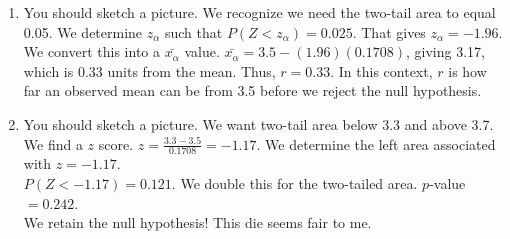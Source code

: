 \documentclass[12pt,letterpaper]{article}
\begin{document}
\begin{multicols}{2}
\begin{enumerate}
\begin{enumerate}
\item You should sketch a picture. We recognize we need the two-tail area to equal 0.05. We determine $z_{\alpha}$ such that $P(Z<z_{\alpha}) = 0.025$. That gives $z_{\alpha}= - 1.96$. We convert this into a $\bar{x_{\alpha}}$ value. $\bar{x_{\alpha}} = 3.5 - (1.96)(0.1708)$, giving 3.17, which is 0.33 units from the mean. Thus, $r=0.33$. In this context, $r$ is how far an observed mean can be from 3.5 before we reject the null hypothesis.
\item You should sketch a picture. We want two-tail area below 3.3 and above 3.7. We find a $z$ score. $z=\frac{3.3-3.5}{0.1708} = -1.17$. We determine the left area associated with $z=-1.17$. \\$P(Z<-1.17) = 0.121$. We double this for the two-tailed area. $p$-value $=0.242$. \\
We retain the null hypothesis! This die seems fair to me.
\end{enumerate}


\end{enumerate}
\end{multicols}
\end{document}
